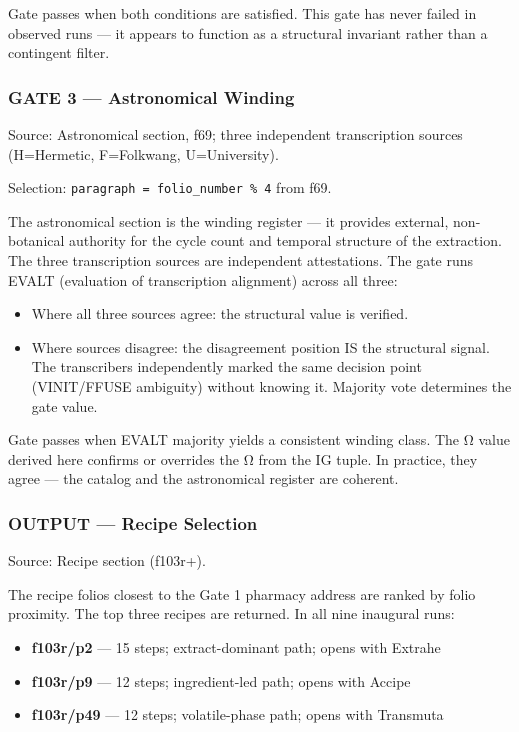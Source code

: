 \documentclass[12pt,a4paper]{article}
\begin{document}
Gate passes when both conditions are satisfied. This gate has never
failed in observed runs --- it appears to function as a structural
invariant rather than a contingent filter.

\hypertarget{gate-3-astronomical-winding}{%
\subsubsection{GATE 3 --- Astronomical
Winding}\label{gate-3-astronomical-winding}}

Source: Astronomical section, f69; three independent transcription
sources (H=Hermetic, F=Folkwang, U=University).

Selection: \texttt{paragraph\ =\ folio\_number\ \%\ 4} from f69.

The astronomical section is the winding register --- it provides
external, non-botanical authority for the cycle count and temporal
structure of the extraction. The three transcription sources are
independent attestations. The gate runs EVALT (evaluation of
transcription alignment) across all three:

\begin{itemize}
\tightlist
\item
  Where all three sources agree: the structural value is verified.
\item
  Where sources disagree: the disagreement position IS the structural
  signal. The transcribers independently marked the same decision point
  (VINIT/FFUSE ambiguity) without knowing it. Majority vote determines
  the gate value.
\end{itemize}

Gate passes when EVALT majority yields a consistent winding class. The Ω
value derived here confirms or overrides the Ω from the IG tuple. In
practice, they agree --- the catalog and the astronomical register are
coherent.

\hypertarget{output-recipe-selection}{%
\subsubsection{OUTPUT --- Recipe
Selection}\label{output-recipe-selection}}

Source: Recipe section (f103r+).

The recipe folios closest to the Gate 1 pharmacy address are ranked by
folio proximity. The top three recipes are returned. In all nine
inaugural runs:

\begin{itemize}
\tightlist
\item
  \textbf{f103r/p2} --- 15 steps; extract-dominant path; opens with
  Extrahe
\item
  \textbf{f103r/p9} --- 12 steps; ingredient-led path; opens with Accipe
\item
  \textbf{f103r/p49} --- 12 steps; volatile-phase path; opens with
  Transmuta
\end{itemize}
\end{document}

